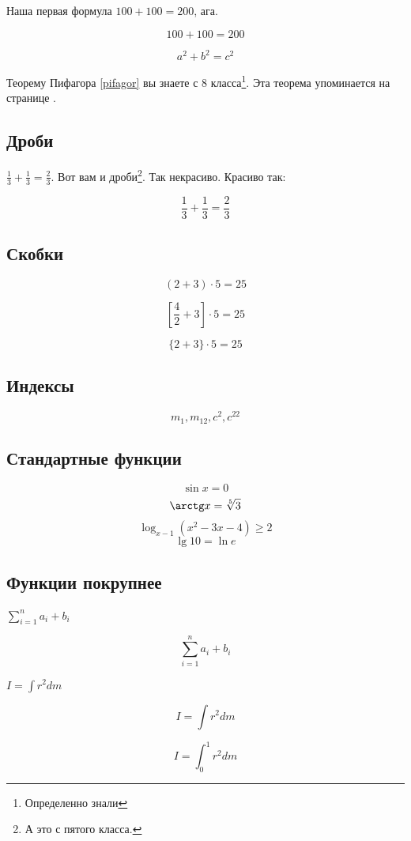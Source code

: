 \documentclass[a4paper,12pt]{article} %
\begin{document}
Наша первая формула $100+100=200$, ага.

\[ 100+100=200 \]

\begin{equation}\label{pifagor}
a^2+b^2=c^2
\end{equation}

Теорему Пифагора \eqref{pifagor} вы знаете с 8 класса\footnote{Определенно знали}. Эта теорема упоминается на странице \pageref{pifagor}.

\subsection{Дроби}

$\frac{1}{3}+\frac{1}{3}=\frac{2}{3}$. Вот вам и дроби\footnote{А это с пятого класса.}. {\scriptsize Так некрасиво.} {\Large Красиво так}:

\[ \frac{1}{3}+\frac{1}{3}=\frac{2}{3} \]


\subsection{Скобки}

\[ (2+3)\cdot 5=25 \]

\[ \left[\frac{4}{2}+3\right]\cdot 5=25 \]

\[ \{2+3\}\cdot 5=25 \]

\subsection{Индексы}

\[ m_1, m_{12}, c^2, c^{22} \]

\subsection{Стандартные функции}

\[ \sin x=0 \]
\[ \arctg x=\sqrt[5]{3} \]
\[ \log_{x-1}{(x^2-3x-4)}\geqslant 2 \]
\[ \lg 10=\ln e \]

\subsection{Функции покрупнее}

$\sum_{i=1}^{n}a_i+b_i$

\[ \sum_{i=1}^{n}a_i+b_i \]

$I=\int r^2dm$

\[I=\int r^2dm \]

\[I=\int_{0}^{1} r^2dm \]
\end{document}
